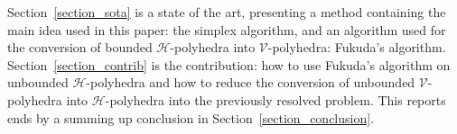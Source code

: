 Section~\ref{section_sota} is a state of the art, presenting a method containing the main idea used in this paper: the simplex algorithm, and an algorithm used for the conversion of bounded $\mathcal{H}$-polyhedra into $\mathcal{V}$-polyhedra: Fukuda's algorithm. Section~\ref{section_contrib} is the contribution: how to use Fukuda's algorithm on unbounded $\mathcal{H}$-polyhedra and how to reduce the conversion of unbounded $\mathcal{V}$-polyhedra into $\mathcal{H}$-polyhedra into the previously resolved problem. This reports ends by a summing up conclusion in Section~\ref{section_conclusion}. 



